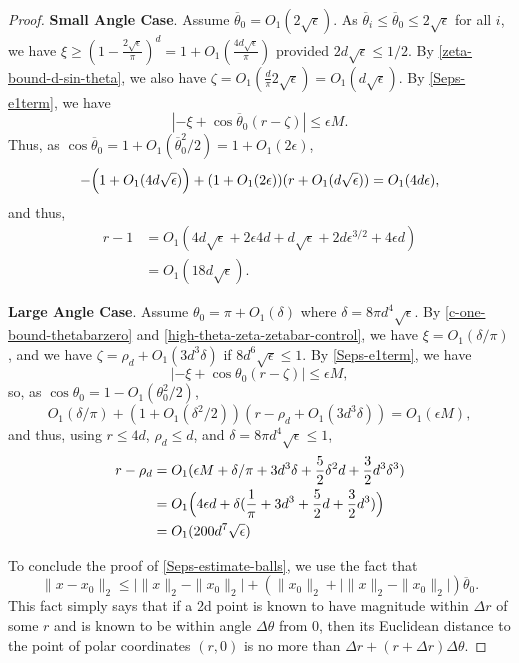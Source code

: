 \documentclass[11pt]{article}
\newcommand{\eps}{\epsilon}
\newcommand{\thetabar}{\overline{\theta}}
\newcommand{\zetacheck}{\rho}
\newcommand{\xo}{x_0}
\begin{document}
\begin{proof}
\textbf{Small Angle Case}.  Assume $\thetabar_0 = O_1(2 \sqrt{\eps})$.  As $\thetabar_i \leq \thetabar_0 \leq 2 \sqrt{\eps}$ for all $i$, we have $\xi \geq (1 - \frac{2\sqrt{\eps}}{\pi})^d = 1 + O_1(\frac{4 d \sqrt{\eps}}{\pi})$ provided $2d \sqrt{\eps} \leq 1/2$.   By \eqref{zeta-bound-d-sin-theta}, we also have $\zeta = O_1( \frac{d}{\pi} 2 \sqrt{\eps}) = O_1(d\sqrt{\eps})$.  By \eqref{Seps-e1term},  we have
\[
|-\xi + \cos \thetabar_0 ( r - \zeta)| \leq \eps M.
\]
Thus, as $\cos \thetabar_0 = 1 + O_1(\thetabar_0^2/2) = 1 + O_1(2 \eps)$,
\[
-\Bigl( 1 + O_1(4 d \sqrt{\eps}) \Bigr) + (1 + O_1(2 \eps) )(r + O_1( d \sqrt{\eps})) = O_1(4 d \eps),
\]
and thus,
\begin{align}
r-1 &= O_1(4d \sqrt{\eps} + 2 \eps 4 d +  d \sqrt{\eps} + 2 d \eps^{3/2} + 4 \eps d)\\
&= O_1(18d \sqrt{\eps}).
\end{align}

\textbf{Large Angle Case}.  Assume $\theta_0 = \pi + O_1(\delta)$ where $\delta = 8 \pi d^4 \sqrt{\eps}$.  By \eqref{c-one-bound-thetabarzero} and \eqref{high-theta-zeta-zetabar-control}, we have $\xi = O_1(\delta/\pi)$, and we have $\zeta = \zetacheck_d + O_1(3 d^3 \delta)$ if $8 d^6 \sqrt{\eps} \leq 1$.
By \eqref{Seps-e1term}, we have 
\[
|-\xi +  \cos \theta_0 (r - \zeta) | \leq \eps M,
\]
so, as $\cos \theta_0 = 1 - O_1(\theta_0^2/2)$,
\[
O_1(\delta/\pi) + (1 + O_1(\delta^2/2))(r - \zetacheck_d + O_1(3 d^3 \delta)) = O_1(\eps M),
\]
and thus, using $r \leq 4 d$, $\zetacheck_d \leq d$, and $\delta = 8 \pi d^4 \sqrt{\eps} \leq 1$,
\begin{align}
r - \zetacheck_d &= O_1(\eps M + \delta/\pi + 3 d^3 \delta + \frac{5}{2} \delta^2 d + \frac{3}{2} d^3 \delta^3) \\
&= O_1 \Bigl(4 \eps d + \delta ( \frac{1}{\pi} + 3 d^3 + \frac{5}{2} d + \frac{3}{2} d^3) \Bigr) \\
&= O_1(200 d^7 \sqrt{\eps})
\end{align}

To conclude the proof of \eqref{Seps-estimate-balls}, we use the fact that
\[
\|x - \xo\|_2 \leq  \bigl| \|x\|_2 - \|\xo\|_2   \bigr| + ( \|\xo\|_2 +  \bigl| \|x\|_2 - \|\xo\|_2   \bigr| ) \thetabar_0.
\]
This fact simply says that if a 2d point is known to have magnitude within $\Delta r$ of some $r$ and is known to be within angle $\Delta \theta$ from $0$, then its Euclidean distance to the point of polar coordinates $(r,0)$ is no more than $\Delta r + (r +  \Delta r) \Delta \theta$.



\end{proof}
\end{document}
